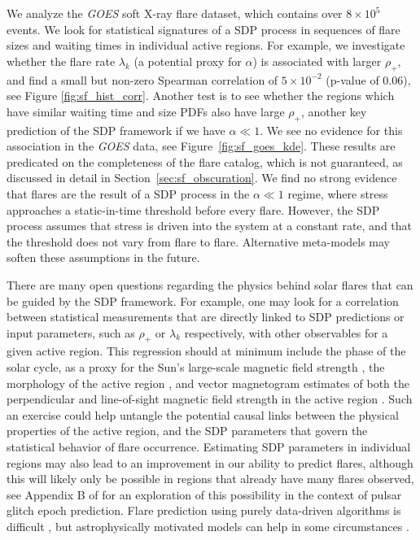 We analyze the \emph{GOES} soft X-ray flare dataset, which contains over $8\times10^5$ events. We look for statistical signatures of a SDP process in sequences of flare sizes and waiting times in individual active regions. For example, we investigate whether the flare rate $\lambda_k$ (a potential proxy for $\alpha$) is associated with larger $\rho_+$, and find a small but non-zero Spearman correlation of $5\times10^{-2}$ (p-value of 0.06), see Figure \ref{fig:sf_hist_corr}. Another test is to see whether the regions which have similar waiting time and size PDFs also have large $\rho_+$, another key prediction of the SDP framework if we have $\alpha \ll 1$. We see no evidence for this association in the \emph{GOES} data, see Figure~\ref{fig:sf_goes_kde}. These results are predicated on the completeness of the flare catalog, which is not guaranteed, as discussed in detail in Section~\ref{sec:sf_obscuration}. We find no strong evidence that flares are the result of a SDP process in the $\alpha \ll 1$ regime, where stress approaches a static-in-time threshold before every flare. However, the SDP process assumes that stress is driven into the system at a constant rate, and that the threshold does not vary from flare to flare. Alternative meta-models may soften these assumptions in the future. 

There are many open questions regarding the physics behind solar flares that can be guided by the SDP framework. For example, one may look for a correlation between statistical measurements that are directly linked to SDP predictions or input parameters, such as $\rho_+$ or $\lambda_k$ respectively, with other observables for a given active region. This regression should at minimum include the phase of the solar cycle, as a proxy for the Sun's large-scale magnetic field strength \citep{Hathaway2015}, the morphology of the active region \citep{Abramenko2023}, and vector magnetogram estimates of both the perpendicular and line-of-sight magnetic field strength in the active region \citep{Bobra2015,Abramenko2017}. Such an exercise could help untangle the potential causal links between the physical properties of the active region, and the SDP parameters that govern the statistical behavior of flare occurrence. Estimating SDP parameters in individual regions may also lead to an improvement in our ability to predict flares, although this will likely only be possible in regions that already have many flares observed, see Appendix B of \citet{Melatos2019} for an exploration of this possibility in the context of pulsar glitch epoch prediction. Flare prediction using purely data-driven algorithms is difficult \citep{Barnes2016,Leka2019,Leka2019a}, but astrophysically motivated models can help in some circumstances \citep{Thibeault2022}.

